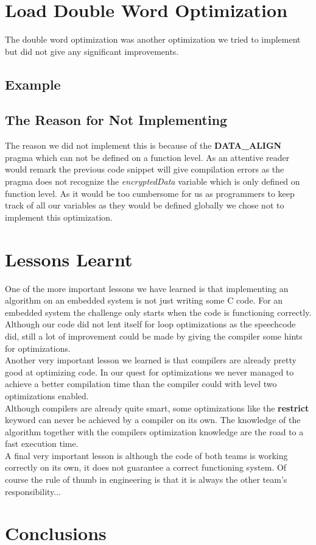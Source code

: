 \documentclass[a4paper]{article}
\begin{document}
\section{Load Double Word Optimization}
The double word optimization was another optimization we tried to implement but did not give any significant improvements.

\subsection{Example}


\subsection{The Reason for Not Implementing}
The reason we did not implement this is because of the \textbf{DATA\_ALIGN} pragma which can not be defined on a function level. As an attentive reader would remark the previous code snippet will give compilation errors as the pragma does not recognize the \textit{encryptedData} variable which is only defined on function level. As it would be too cumbersome for us as programmers to keep track of all our variables as they would be defined globally we chose not to implement this optimization.

\section{Lessons Learnt}
One of the more important lessons we have learned is that implementing an algorithm on an embedded system is not just writing some C code. For an embedded system the challenge only starts when the code is functioning correctly. Although our code did not lent itself for loop optimizations as the speechcode did, still a lot of improvement could be made by giving the compiler some hints for optimizations.\\

Another very important lesson we learned is that compilers are already pretty good at optimizing code. In our quest for optimizations we never managed to achieve a better compilation time than the compiler could with level two optimizations enabled. \\

Although compilers are already quite smart, some optimizations like the \textbf{restrict} keyword can never be achieved by a compiler on its own. The knowledge of the algorithm together with the compilers optimization knowledge are the road to a fast execution time.\\

A final very important lesson is although the code of both teams is working correctly on its own, it does not guarantee a correct functioning system. Of course the rule of thumb in engineering is that it is always the other team's responsibility...

\section{Conclusions}
\end{document}
